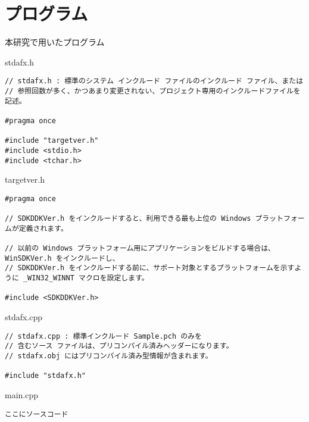 \chapter{プログラム}
\thispagestyle{fancy}

本研究で用いたプログラム

\vspace{1cm}

stdafx.h

\begin{lstlisting}
// stdafx.h : 標準のシステム インクルード ファイルのインクルード ファイル、または
// 参照回数が多く、かつあまり変更されない、プロジェクト専用のインクルードファイルを記述。

#pragma once

#include "targetver.h"
#include <stdio.h>
#include <tchar.h>
\end{lstlisting}



\vspace{1.5cm}

targetver.h
\begin{lstlisting}
#pragma once

// SDKDDKVer.h をインクルードすると、利用できる最も上位の Windows プラットフォームが定義されます。

// 以前の Windows プラットフォーム用にアプリケーションをビルドする場合は、WinSDKVer.h をインクルードし、
// SDKDDKVer.h をインクルードする前に、サポート対象とするプラットフォームを示すように _WIN32_WINNT マクロを設定します。

#include <SDKDDKVer.h>
\end{lstlisting}


\vspace{1.5cm}

stdafx.cpp
\begin{lstlisting}
// stdafx.cpp : 標準インクルード Sample.pch のみを
// 含むソース ファイルは、プリコンパイル済みヘッダーになります。
// stdafx.obj にはプリコンパイル済み型情報が含まれます。

#include "stdafx.h"
\end{lstlisting}

\vspace{1.5cm}

main.cpp
\begin{lstlisting}
ここにソースコード
\end{lstlisting}